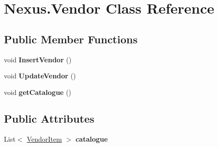 \hypertarget{class_nexus_1_1_vendor}{}\section{Nexus.\+Vendor Class Reference}
\label{class_nexus_1_1_vendor}
\subsection*{Public Member Functions}
\begin{DoxyCompactItemize}
\item 
\mbox{\label{class_nexus_1_1_vendor_ad53e0ffa81eac2b9f60d146c7ca146ae}} 
void {\bfseries Insert\+Vendor} ()
\item 
\mbox{\label{class_nexus_1_1_vendor_a61e12a88cfbc5125f8b52e6f2310fef4}} 
void {\bfseries Update\+Vendor} ()
\item 
\mbox{\label{class_nexus_1_1_vendor_a8b20e027dd5aa0a1360f3443bf37b829}} 
void {\bfseries get\+Catalogue} ()
\end{DoxyCompactItemize}
\subsection*{Public Attributes}
\begin{DoxyCompactItemize}
\item 
\mbox{\label{class_nexus_1_1_vendor_af52fccda0b20a811469efb47549ff362}} 
List$<$ \mbox{\hyperlink{class_nexus_1_1_vendor_item}{Vendor\+Item}} $>$ {\bfseries catalogue}
\end{DoxyCompactItemize}
